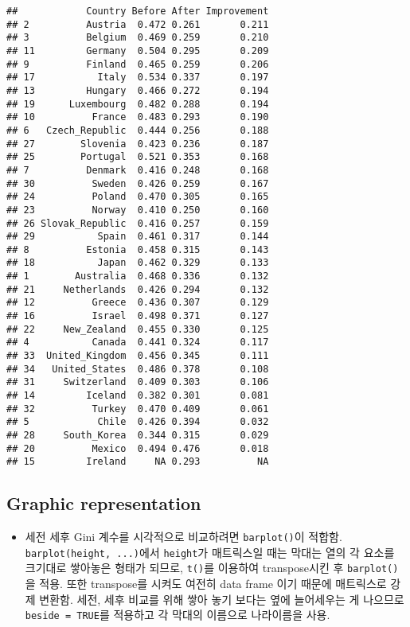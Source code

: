 \documentclass[
]{article}
\providecommand{\tightlist}{%
  \setlength{\itemsep}{0pt}\setlength{\parskip}{0pt}}
\begin{document}
\begin{verbatim}
##            Country Before After Improvement
## 2          Austria  0.472 0.261       0.211
## 3          Belgium  0.469 0.259       0.210
## 11         Germany  0.504 0.295       0.209
## 9          Finland  0.465 0.259       0.206
## 17           Italy  0.534 0.337       0.197
## 13         Hungary  0.466 0.272       0.194
## 19      Luxembourg  0.482 0.288       0.194
## 10          France  0.483 0.293       0.190
## 6   Czech_Republic  0.444 0.256       0.188
## 27        Slovenia  0.423 0.236       0.187
## 25        Portugal  0.521 0.353       0.168
## 7          Denmark  0.416 0.248       0.168
## 30          Sweden  0.426 0.259       0.167
## 24          Poland  0.470 0.305       0.165
## 23          Norway  0.410 0.250       0.160
## 26 Slovak_Republic  0.416 0.257       0.159
## 29           Spain  0.461 0.317       0.144
## 8          Estonia  0.458 0.315       0.143
## 18           Japan  0.462 0.329       0.133
## 1        Australia  0.468 0.336       0.132
## 21     Netherlands  0.426 0.294       0.132
## 12          Greece  0.436 0.307       0.129
## 16          Israel  0.498 0.371       0.127
## 22     New_Zealand  0.455 0.330       0.125
## 4           Canada  0.441 0.324       0.117
## 33  United_Kingdom  0.456 0.345       0.111
## 34   United_States  0.486 0.378       0.108
## 31     Switzerland  0.409 0.303       0.106
## 14         Iceland  0.382 0.301       0.081
## 32          Turkey  0.470 0.409       0.061
## 5            Chile  0.426 0.394       0.032
## 28     South_Korea  0.344 0.315       0.029
## 20          Mexico  0.494 0.476       0.018
## 15         Ireland     NA 0.293          NA
\end{verbatim}

\hypertarget{graphic-representation}{%
\subsection{Graphic representation}\label{graphic-representation}}

\begin{itemize}
\tightlist
\item
  세전 세후 Gini 계수를 시각적으로 비교하려면 \texttt{barplot()}이
  적합함. \texttt{barplot(height,\ ...)}에서 \texttt{height}가
  매트릭스일 때는 막대는 열의 각 요소를 크기대로 쌓아놓은 형태가 되므로,
  \texttt{t()}를 이용하여 transpose시킨 후 \texttt{barplot()}을 적용.
  또한 transpose를 시켜도 여전히 data frame 이기 때문에 매트릭스로 강제
  변환함. 세전, 세후 비교를 위해 쌓아 놓기 보다는 옆에 늘어세우는 게
  나으므로 \texttt{beside\ =\ TRUE}를 적용하고 각 막대의 이름으로
  나라이름을 사용.
\end{itemize}
\end{document}
